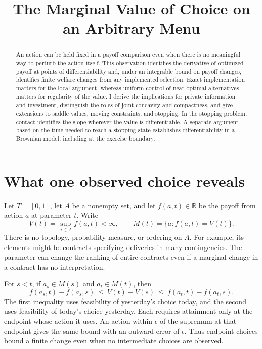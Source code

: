 \documentclass[11pt]{article}
\title{The Marginal Value of Choice on an Arbitrary Menu}
\author{}
\date{}
\newcommand{\R}{\mathbb R}
\begin{document}
\maketitle

\begin{abstract}
An action can be held fixed in a payoff comparison even when there is no meaningful way to perturb the action itself. This observation identifies the derivative of optimized payoff at points of differentiability and, under an integrable bound on payoff changes, identifies finite welfare changes from any implemented selection. Exact implementation matters for the local argument, whereas uniform control of near-optimal alternatives matters for regularity of the value. I derive the implications for private information and investment, distinguish the roles of joint concavity and compactness, and give extensions to saddle values, moving constraints, and stopping. In the stopping problem, contact identifies the slope wherever the value is differentiable. A separate argument based on the time needed to reach a stopping state establishes differentiability in a Brownian model, including at the exercise boundary.
\end{abstract}

\section{What one observed choice reveals}

Let \(T=[0,1]\), let \(A\) be a nonempty set, and let \(f(a,t)\in\R\) be the payoff from action \(a\) at parameter \(t\). Write
\[
 V(t)=\sup_{a\in A} f(a,t)<\infty,\qquad
 M(t)=\{a:f(a,t)=V(t)\}.
\]
There is no topology, probability measure, or ordering on \(A\). For example, its elements might be contracts specifying deliveries in many contingencies. The parameter can change the ranking of entire contracts even if a marginal change in a contract has no interpretation.

For \(s<t\), if \(a_s\in M(s)\) and \(a_t\in M(t)\), then
\begin{equation}
 f(a_s,t)-f(a_s,s)\ \leq\ V(t)-V(s)\
 \leq\ f(a_t,t)-f(a_t,s).                         \label{eq:revealed}
\end{equation}
The first inequality uses feasibility of yesterday's choice today, and the second uses feasibility of today's choice yesterday. Each requires attainment only at the endpoint whose action it uses. An action within \(\epsilon\) of the supremum at that endpoint gives the same bound with an outward error of \(\epsilon\). Thus endpoint choices bound a finite change even when no intermediate choices are observed.
\end{document}
